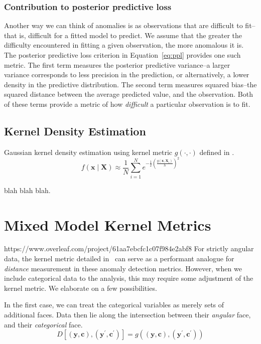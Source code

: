 \subsubsection{Contribution to posterior predictive loss}
Another way we can think of anomalies is as observations that are difficult to fit--that is, difficult
    for a fitted model to predict.  We assume that the greater the difficulty encountered in fitting a
    given observation, the more anomalous it is.  The posterior predictive loss criterion in
    Equation~\ref{eq:ppl} provides one such metric.  The first term measures the posterior predictive
    variance--a larger variance corresponds to less precision in the prediction, or alternatively, a lower
    density in the predictive distribution.  The second term measures squared bias--the squared distance
    between the average predicted value, and the observation.  Both of these terms provide a metric of
    how \emph{difficult} a particular observation is to fit.

\subsection{Kernel Density Estimation}

Gaussian kernel density estimation using kernel metric $g(\cdot,\cdot)$ defined in \cite{trubey:pg}.
\begin{equation}
    f(\bm{x}\mid \bm{X}) \approx \frac{1}{N}\sum_{i = 1}^Ne^{-\frac{1}{2}\left(\frac{g(\bm{x},\bm{X}_i)}{h}\right)^2}
\end{equation}

blah blah blah.

\section{Mixed Model Kernel Metrics}https://www.overleaf.com/project/61aa7ebcfc1c07f984e2abf8
For strictly angular data, the kernel metric detailed in~\cite{trubey:pg} can serve as a 
  performant analogue for \emph{distance} measurement in these anomaly detection metrics.  However, 
  when we include categorical data to the analysis, this may require some adjustment of the kernel 
  metric.  We elaborate on a few possibilities.


In the first case, we can treat the categorical variables as merely sets of additional faces.  Data then lie 
    along the intersection between their \emph{angular} face, and their \emph{categorical} face.  
\begin{equation}
    D\left[(\bm{y},\bm{c}), (\bm{y}^{\prime}, \bm{c}^{\prime})\right] = g\left((\bm{y},\bm{c}), (\bm{y}^{\prime}, \bm{c}^{\prime})\right)
\end{equation}

